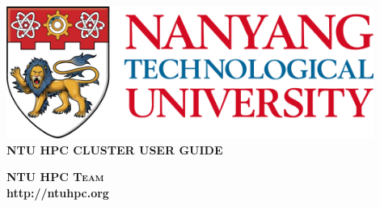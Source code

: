 \begin{titlepage}
\begin{center}

\includegraphics[width=0.9\textwidth]{images/ntu_logo.png}
\\[5cm]

\uppercase{\textbf{NTU HPC Cluster User Guide}}
\\[5cm]

\uppercase{
\textbf{
}}

\vfill

\textsc{\bfseries NTU HPC Team}
\\
\textbf{http://ntuhpc.org}

\end{center}
\end{titlepage}
